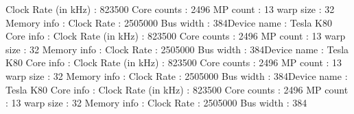 \documentclass{article}
\begin{document}
    Clock Rate (in kHz) : 823500\newline
    Core counts : 2496\newline
    MP count : 13\newline
    warp size : 32\newline
  Memory info :\newline
    Clock Rate : 2505000 Bus width : 384\newline\newline Device name : Tesla K80\newline
  Core info :\newline
    Clock Rate (in kHz) : 823500\newline
    Core counts : 2496\newline
    MP count : 13\newline
    warp size : 32\newline
  Memory info :\newline
    Clock Rate : 2505000 Bus width : 384\newline\newline Device name : Tesla K80\newline
  Core info :\newline
    Clock Rate (in kHz) : 823500\newline
    Core counts : 2496\newline
    MP count : 13\newline
    warp size : 32\newline
  Memory info :\newline
    Clock Rate : 2505000 Bus width : 384\newline\newline Device name : Tesla K80\newline
  Core info :\newline
    Clock Rate (in kHz) : 823500\newline
    Core counts : 2496\newline
    MP count : 13\newline
    warp size : 32\newline
  Memory info :\newline
    Clock Rate : 2505000 Bus width : 384\newline\newline 
\end{document}
